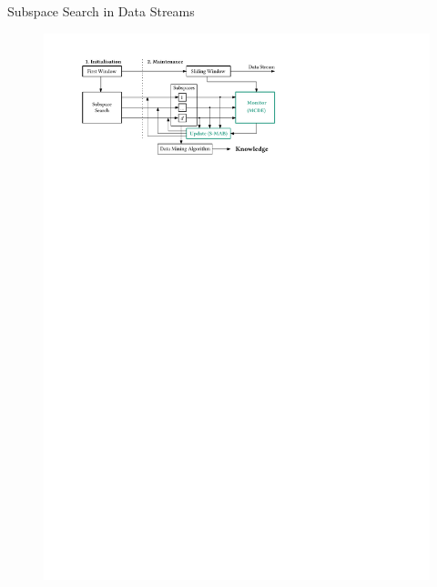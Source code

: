 \documentclass[16pt,usenames,dvipsnames, notheorems]{beamer}
\theoremstyle{definition}
\theoremstyle{example}
\theoremstyle{plain}
\begin{document}
\begin{frame}{Subspace Search in Data Streams}
\begin{figure}
\begin{overprint}
		\includegraphics[width=0.9\linewidth]{figures/SGMRD_workflow_1-compressed.pdf}
	\end{overprint}
	\label{fig:SGMRD_workflow}
\end{figure} 
\end{frame}
\end{document}
